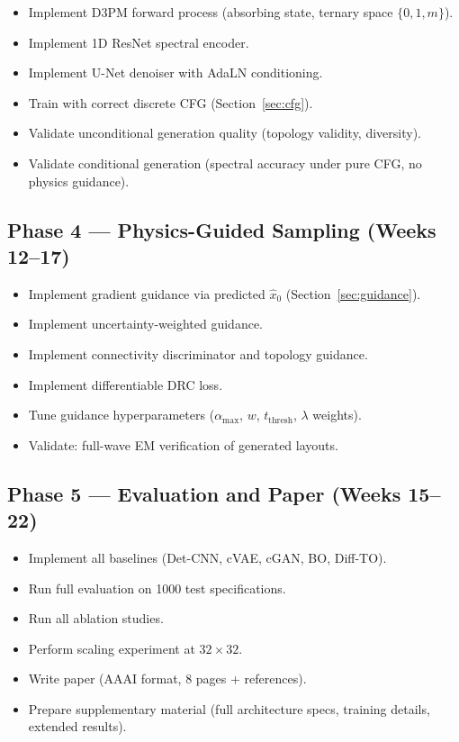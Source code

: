 \documentclass[12pt,a4paper]{article}
\newcommand{\tthresh}{t_{\mathrm{thresh}}}
\newcommand{\alphamax}{\alpha_{\max}}
\theoremstyle{definition}
\theoremstyle{plain}
\theoremstyle{remark}
\begin{document}
\begin{itemize}
  \item[$\square$] Implement D3PM forward process
        (absorbing state, ternary space $\{0,1,m\}$).
  \item[$\square$] Implement 1D ResNet spectral encoder.
  \item[$\square$] Implement U-Net denoiser with AdaLN conditioning.
  \item[$\square$] Train with correct discrete CFG (Section~\ref{sec:cfg}).
  \item[$\square$] Validate unconditional generation quality
        (topology validity, diversity).
  \item[$\square$] Validate conditional generation
        (spectral accuracy under pure CFG, no physics guidance).
\end{itemize}

\subsection{Phase 4 — Physics-Guided Sampling (Weeks 12--17)}

\begin{itemize}
  \item[$\square$] Implement gradient guidance via predicted $\hat{x}_0$
        (Section~\ref{sec:guidance}).
  \item[$\square$] Implement uncertainty-weighted guidance.
  \item[$\square$] Implement connectivity discriminator and topology guidance.
  \item[$\square$] Implement differentiable DRC loss.
  \item[$\square$] Tune guidance hyperparameters
        ($\alphamax$, $w$, $\tthresh$, $\lambda$ weights).
  \item[$\square$] Validate: full-wave EM verification of generated layouts.
\end{itemize}

\subsection{Phase 5 — Evaluation and Paper (Weeks 15--22)}

\begin{itemize}
  \item[$\square$] Implement all baselines (Det-CNN, cVAE, cGAN, BO, Diff-TO).
  \item[$\square$] Run full evaluation on 1000 test specifications.
  \item[$\square$] Run all ablation studies.
  \item[$\square$] Perform scaling experiment at $32\times32$.
  \item[$\square$] Write paper (AAAI format, 8 pages + references).
  \item[$\square$] Prepare supplementary material
        (full architecture specs, training details, extended results).
\end{itemize}
\end{document}
